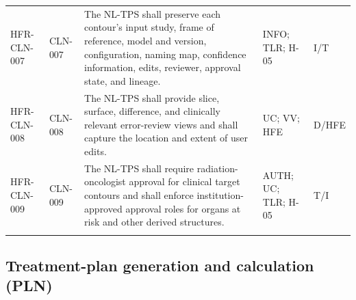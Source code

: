 \documentclass[11pt,letterpaper]{article}
\begin{document}
\begin{scriptsize}
\begin{longtable}{@{}L{0.14\textwidth}L{0.09\textwidth}L{0.47\textwidth}L{0.15\textwidth}L{0.07\textwidth}@{}}
\addlinespace[2pt]
\mbox{HFR-CLN-007} & \mbox{CLN-007} & The NL-TPS shall preserve each contour's input study, frame of reference, model and version, configuration, naming map, confidence information, edits, reviewer, approval state, and lineage. & INFO; TLR; H-05 & I\slash\allowbreak{}T \\
\addlinespace[2pt]
\mbox{HFR-CLN-008} & \mbox{CLN-008} & The NL-TPS shall provide slice, surface, difference, and clinically relevant error-review views and shall capture the location and extent of user edits. & UC; VV; HFE & D\slash\allowbreak{}HFE \\
\addlinespace[2pt]
\mbox{HFR-CLN-009} & \mbox{CLN-009} & The NL-TPS shall require radiation-oncologist approval for clinical target contours and shall enforce institution-approved approval roles for organs at risk and other derived structures. & AUTH; UC; TLR; H-05 & T\slash\allowbreak{}I \\
\addlinespace[2pt]
\end{longtable}
\end{scriptsize}

\subsection{Treatment-plan generation and calculation (PLN)}
\end{document}
